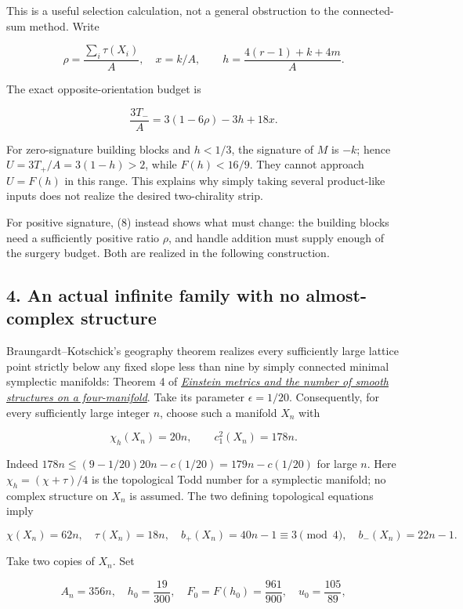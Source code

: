 \documentclass[
  10pt,
]{article}
\begin{document}
This is a useful selection calculation, not a general obstruction to the
connected-sum method. Write

\[
 \rho=\frac{\sum_i\tau(X_i)}A,\quad x=k/A,
 \qquad h=\frac{4(r-1)+k+4m}A.
\]

The exact opposite-orientation budget is

\[
 \frac{3T_-}A=3(1-6\rho)-3h+18x.
 \tag{8}
\]

For zero-signature building blocks and \(h<1/3\), the signature of \(M\)
is \(-k\); hence \(U=3T_+/A=3(1-h)>2\), while \(F(h)<16/9\). They cannot
approach \(U=F(h)\) in this range. This explains why simply taking
several product-like inputs does not realize the desired two-chirality
strip.

For positive signature, (8) instead shows what must change: the building
blocks need a sufficiently positive ratio \(\rho\), and handle addition
must supply enough of the surgery budget. Both are realized in the
following construction.

\hypertarget{an-actual-infinite-family-with-no-almost-complex-structure}{%
\subsection{4. An actual infinite family with no almost-complex
structure}\label{an-actual-infinite-family-with-no-almost-complex-structure}}

Braungardt--Kotschick's geography theorem realizes every sufficiently
large lattice point strictly below any fixed slope less than nine by
simply connected minimal symplectic manifolds: Theorem 4 of
\href{https://arxiv.org/pdf/math/0306021}{\emph{Einstein metrics and the
number of smooth structures on a four-manifold}}. Take its parameter
\(\epsilon=1/20\). Consequently, for every sufficiently large integer
\(n\), choose such a manifold \(X_n\) with

\[
 \chi_h(X_n)=20n,\qquad c_1^2(X_n)=178n.
 \tag{9}
\]

Indeed \(178n\le(9-1/20)20n-c(1/20)=179n-c(1/20)\) for large \(n\). Here
\(\chi_h=(\chi+\tau)/4\) is the topological Todd number for a symplectic
manifold; no complex structure on \(X_n\) is assumed. The two defining
topological equations imply

\[
 \chi(X_n)=62n,\quad \tau(X_n)=18n,\quad
 b_+(X_n)=40n-1\equiv3\pmod4,\quad b_-(X_n)=22n-1.
 \tag{10}
\]

Take two copies of \(X_n\). Set

\[
 A_n=356n,\quad h_0=\frac{19}{300},\quad F_0=F(h_0)=\frac{961}{900},
 \quad u_0=\frac{105}{89},
\]
\end{document}
